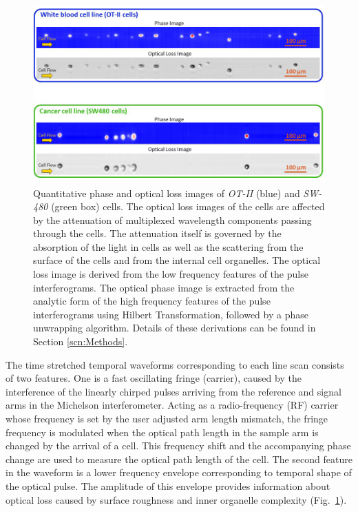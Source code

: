 \documentclass[aps,pra,reprint,superscriptaddress]{revtex4-1}
\begin{document}
\begin{figure}
\includegraphics[scale=0.5]{Figure2DImage.jpg}
\caption{\label{fig:2DImage} Quantitative phase and optical loss images of \textit{OT-II} (blue) and \textit{SW-480} (green box) cells. The optical loss images of the cells are affected by the attenuation of multiplexed wavelength components passing through the cells. The attenuation itself is governed by the absorption of the light in cells as well as the scattering from the surface of the cells and from the internal cell organelles. The optical loss image is derived from the low frequency features of the pulse interferograms. The optical phase image is extracted from the analytic form of the high frequency features of the pulse interferograms using Hilbert Transformation, followed by a phase unwrapping algorithm. Details of these derivations can be found in Section \ref{scn:Methods}.}
\end{figure}

The time stretched temporal waveforms corresponding to each line scan consists of two features. One is a fast oscillating fringe (carrier), caused by the interference of the linearly chirped pulses arriving from the reference and signal arms in the Michelson interferometer. Acting as a radio-frequency (RF) carrier whose frequency is set by the user adjusted arm length mismatch, the fringe frequency is modulated when the optical path length in the sample arm is changed by the arrival of a cell. This frequency shift and the accompanying phase change are used to measure the optical path length of the cell. The second feature in the waveform is a lower frequency envelope corresponding to temporal shape of the optical pulse. The amplitude of this envelope provides information about optical loss caused by surface roughness and inner organelle complexity (Fig.~\ref{fig:2DImage}). 
\end{document}
